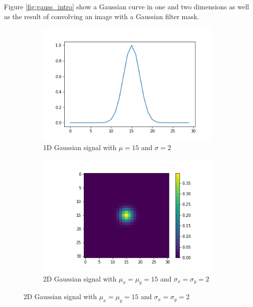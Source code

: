 		Figure \ref{fig:gauss_intro} show a Gaussian curve in one and two dimensions as well as the result of convolving an image with a Gaussian filter mask. 
		\begin{figure}
		    \centering
		    \begin{subfigure}[b]{0.3\textwidth}
		        \includegraphics[width=\textwidth]{graphs/gauss_sigma_2.png}
		        \caption{1D Gaussian signal with $\mu=15$ and $\sigma=2$}
		    \end{subfigure}
		    
		    \begin{subfigure}[b]{0.3\textwidth}
		        \includegraphics[width=\textwidth]{images/gauss_sigma_2.png}
		        \caption{2D Gaussian signal with $\mu_x = \mu_y = 15$ and $\sigma_x = \sigma_y = 2$}
		    \end{subfigure}
		    

\end{figure}
